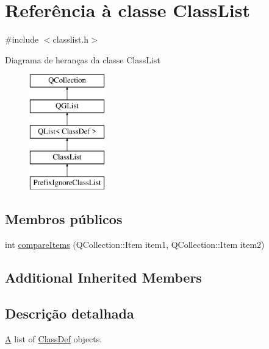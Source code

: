 \hypertarget{class_class_list}{\section{Referência à classe Class\-List}
\label{class_class_list}
}


{\ttfamily \#include $<$classlist.\-h$>$}

Diagrama de heranças da classe Class\-List\begin{figure}[H]
\begin{center}
\leavevmode
\includegraphics[height=5.000000cm]{class_class_list}
\end{center}
\end{figure}
\subsection*{Membros públicos}
\begin{DoxyCompactItemize}
\item 
int \hyperlink{class_class_list_a219450accf048597ffc7113ecde4c402}{compare\-Items} (Q\-Collection\-::\-Item item1, Q\-Collection\-::\-Item item2)
\end{DoxyCompactItemize}
\subsection*{Additional Inherited Members}


\subsection{Descrição detalhada}
\hyperlink{class_a}{A} list of \hyperlink{class_class_def}{Class\-Def} objects. 

